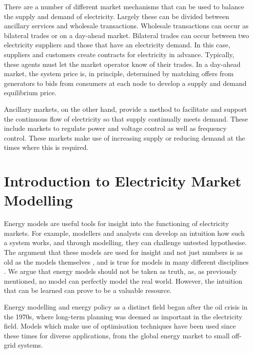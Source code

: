There are a number of different market mechanisms that can be used to balance the supply and demand of electricity. Largely these can be divided between ancillary services and wholesale transactions. Wholesale transactions can occur as bilateral trades or on a day-ahead market. Bilateral trades can occur between two electricity suppliers and those that have an electricity demand. In this case, suppliers and customers create contracts for electricity in advance. Typically, these agents must let the market operator know of their trades. In a day-ahead market, the system price is, in principle, determined by matching offers from generators to bids from consumers at each node to develop a supply and demand equilibrium price. 

Ancillary markets, on the other hand, provide a method to facilitate and support the continuous flow of electricity so that supply continually meets demand. These include markets to regulate power and voltage control as well as frequency control. These markets make use of increasing supply or reducing demand at the times where this is required. 







\section{Introduction to Electricity Market Modelling}
\label{sec:intro:elecmarketsmodelling}


Energy models are useful tools for insight into the functioning of electricity markets. For example, modellers and analysts can develop an intuition how such a system works, and through modelling, they can challenge untested hypothesise. The argument that these models are used for insight and not just numbers is as old as the models themselves \cite{Huntington1982, Pfenninger2014a}, and is true for models in many different disciplines \cite{Geoffrion1976}. We argue that energy models should not be taken as truth, as, as previously mentioned, no model can perfectly model the real world. However, the intuition that can be learned can prove to be a valuable resource.

Energy modelling and energy policy as a distinct field began after the oil crisis in the 1970s, where long-term planning was deemed as important in the electricity field. Models which make use of optimisation techniques have been used since these times for diverse applications, from the global energy market to small off-grid systems.

